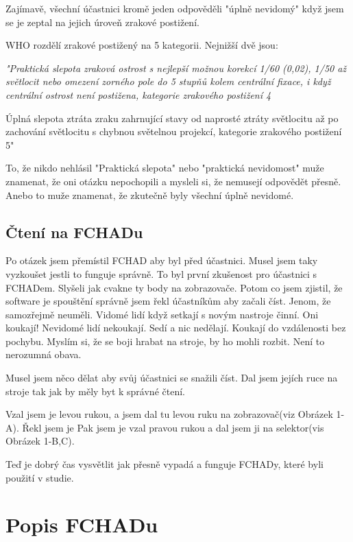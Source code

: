 Zajímavě, všechní účastnici kromě jeden odpověděli "úplně nevidomý" když jsem se je zeptal na jejich úroveň zrakové postižení.

WHO rozdělí zrakové postižený na 5 kategorii. Nejnižší dvě jsou:

\em "Praktická slepota
zraková ostrost s nejlepší možnou korekcí 1/60 (0,02), 1/50 až světlocit nebo omezení zorného pole do 5 stupňů kolem centrální fixace, i když centrální ostrost není postižena, kategorie zrakového postižení 4

Úplná slepota ztráta zraku zahrnující stavy od naprosté ztráty světlocitu až po zachování světlocitu s chybnou světelnou projekcí, kategorie zrakového postižení 5" \em \citep{sonsklasifikace}

To, že nikdo nehlásil "Praktická slepota" nebo "praktická nevidomost" muže znamenat, že oni otázku nepochopili a mysleli si, že nemusejí odpovědět přesně.  Anebo to muže znamenat, že zkutečně byly všechní úplně nevidomé.

\subsection{Čtení na FCHADu}

Po otázek jsem přemístil FCHAD aby byl před účastnici.  Musel jsem taky vyzkoušet jestli to funguje správně. To byl první zkušenost pro účastnici s FCHADem.  Slyšeli jak cvakne ty body na zobrazovače.  Potom co jsem zjistil, že software je spouštění správně jsem řekl účastníkům aby začali číst.  Jenom, že samozřejmě neuměli.  Vidomé lidí když setkají s novým nastroje činní. Oni koukají!  Nevidomé lidí nekoukají.  Sedí a nic nedělají.  Koukají do vzdálenosti bez pochybu.  Myslím si, že se boji hrabat na stroje, by ho mohli rozbit.  Není to nerozumná obava.

Musel jsem něco dělat aby svůj účastnici se snažili číst. Dal jsem jejích ruce na stroje tak jak by měly byt k správné čtení.

Vzal jsem je levou rukou, a jsem dal tu levou ruku na zobrazovač(viz Obrázek 1-A). Řekl jsem je   Pak jsem je vzal pravou rukou a dal jsem ji na selektor(vis Obrázek 1-B,C).

Teď je dobrý čas vysvětlit jak přesně vypadá a funguje FCHADy, které byli použití v studie.

\section{Popis FCHADu}

